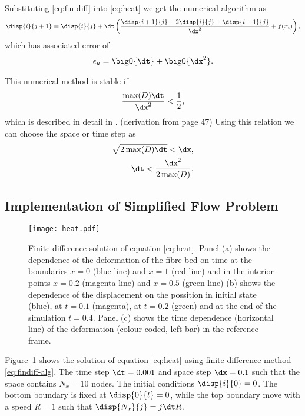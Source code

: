 \documentclass[twoside,a4paper,12pt]{article}
\newcommand{\figref}[1]{Figure~\ref{#1}}
\newcommand{\note}[1]{{\color{red}(#1)}}
\begin{document}
Substituting \eqref{eq:fin-diff} into \eqref{eq:heat} we get the
numerical algorithm as
%
\begin{align}
\disp{i}{j+1}  =   \disp{i}{j} + \dt\left(\frac{\disp{i+1}{j} - 2\disp{i}{j} + \disp{i-1}{j}}{\dx^2}   + f(x_i) \right), \label{eq:findiff-alg}
\end{align}
%
which has associated error of
\begin{align}
  \epsilon_u =\bigO{\dt} + \bigO{\dx^2}.
\end{align}

This numerical method is stable if
\begin{align}
  \frac{\max(D)\dt}{\dx^2} < \frac{1}{2},
\end{align}
which is described in detail in \cite{Strikwerda2004}.
%
\note{derivation from page 47}
%
Using this relation we can choose the space or time step as
%
\begin{align}
  \sqrt{2\max(D)\dt} < \dx, \\
  \dt < \frac{\dx^2}{2\max(D)}.
\end{align}

\subsection{Implementation of Simplified Flow Problem}

\begin{figure}
  \centering
  \texttt{[image: heat.pdf]}
  \caption{Finite difference solution of equation
    \eqref{eq:heat}. Panel (a) shows the dependence of the deformation
    of the fibre bed on time at the boundaries $x=0$ (blue line) and
    $x=1$ (red line) and in the interior points $x=0.2$ (magenta line)
    and $x=0.5$ (green line) (b) shows the dependence of the
    displacement on the possition in initial state (blue), at $t=0.1$
    (magenta), at $t=0.2$ (green) and at the end of the simulation
    $t=0.4$.  Panel (c) shows the time dependence (horizontal line) of
    the deformation (colour-coded, left bar) in the reference frame.}
  \label{fig:findiff-heat}
\end{figure}

\figref{fig:findiff-heat} shows the solution of equation
\eqref{eq:heat} using finite difference method
\eqref{eq:findiff-alg}. The time step $\dt=0.001$ and space step
$\dx = 0.1$ such that the space contains $N_x=10$ nodes. The initial
conditions $\disp{i}{0} = 0$. The bottom boundary is fixed at
$\disp{0}{t} = 0$, while the top boundary move with a speed $R=1$ such
that $\disp{N_x}{j} = j \dt R$.
\end{document}
